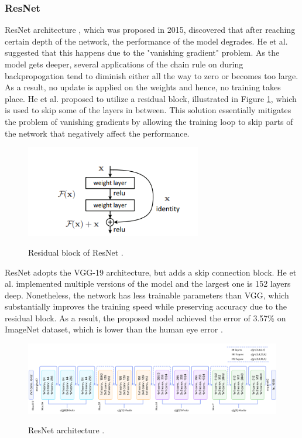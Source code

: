 \documentclass[english, 12pt, a4paper, elec, utf8, a-1b, online]{aaltothesis}
\begin{document}
\subsubsection{ResNet}
ResNet architecture \cite{He2015}, which was proposed in 2015, discovered that after reaching certain depth of the network, the performance of the model degrades. He et al. \cite{He2015} suggested that this happens due to the "vanishing gradient" problem. As the model gets deeper, several applications of the chain rule on during backpropogation tend to diminish either all the way to zero or becomes too large. As a result, no update is applied on the weights and hence, no training takes place. He et al. proposed to utilize a residual block, illustrated in Figure \ref{resnet}, which is used to skip some of the layers in between.  This solution essentially mitigates the problem of vanishing gradients by allowing the training loop to skip parts of the network that negatively affect the performance.

\begin{figure}[htb]
	\begin{center}
		\includegraphics[height=4cm]{./resnet.png}
	\end{center}
	\caption{Residual block of ResNet \cite{He2015}.}
	\begin{center}
		\label{resnet}
	\end{center}
\end{figure}
\FloatBarrier

ResNet adopts the VGG-19 architecture, but adds a skip connection block. He et al. implemented multiple versions of the model and the largest one is 152 layers deep. Nonetheless, the network has less trainable parameters than VGG, which substantially improves the training speed while preserving accuracy due to the residual block. As a result, the proposed model achieved the error of 3.57\% on ImageNet dataset, which is lower than the human eye error \cite{He2015}.

\begin{figure}[htb]
	\begin{center}
		\includegraphics[width=16cm]{./resnetFull.png}
	\end{center}
	\caption{ResNet architecture \cite{resnet50}.}
	\begin{center}
		\label{resnetFull}
	\end{center}
\end{figure}
\FloatBarrier
\end{document}
